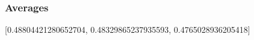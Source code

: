 \documentclass{article}
\begin{document}
\subsubsection{Averages}
[0.48804421280652704, 0.48329865237935593, 0.4765028936205418]

\begin{center}
\end{center}
\end{document}
